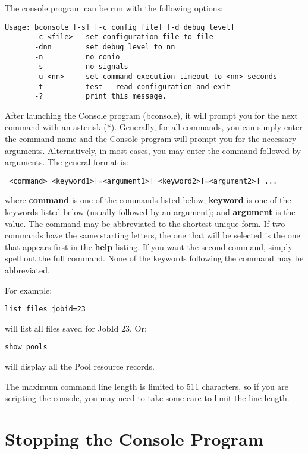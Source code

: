 The console program can be run with the following options:
\footnotesize
\begin{verbatim}
Usage: bconsole [-s] [-c config_file] [-d debug_level]
       -c <file>   set configuration file to file
       -dnn        set debug level to nn
       -n          no conio
       -s          no signals
       -u <nn>     set command execution timeout to <nn> seconds
       -t          test - read configuration and exit
       -?          print this message.
\end{verbatim}
\normalsize


After launching the Console program (bconsole), it will prompt you for the next
command with an asterisk (*).  Generally, for all commands, you can simply
enter the command name and the Console program will prompt you for the
necessary arguments. Alternatively, in most cases, you may enter the command
followed by arguments. The general format is:

\footnotesize
\begin{verbatim}
 <command> <keyword1>[=<argument1>] <keyword2>[=<argument2>] ...
\end{verbatim}
\normalsize

where {\bf command} is one of the commands listed below; {\bf keyword} is one
of the keywords listed below (usually followed by an argument); and {\bf
argument} is the value. The command may be abbreviated to the shortest unique
form. If two commands have the same starting letters, the one that will be
selected is the one that appears first in the {\bf help} listing. If you want
the second command, simply spell out the full command. None of the keywords
following the command may be abbreviated. 

For example: 

\footnotesize
\begin{verbatim}
list files jobid=23
\end{verbatim}
\normalsize

will list all files saved for JobId 23. Or: 

\footnotesize
\begin{verbatim}
show pools
\end{verbatim}
\normalsize

will display all the Pool resource records. 

The maximum command line length is limited to 511 characters, so if you
are scripting the console, you may need to take some care to limit the
line length.

\section{Stopping the Console Program}

